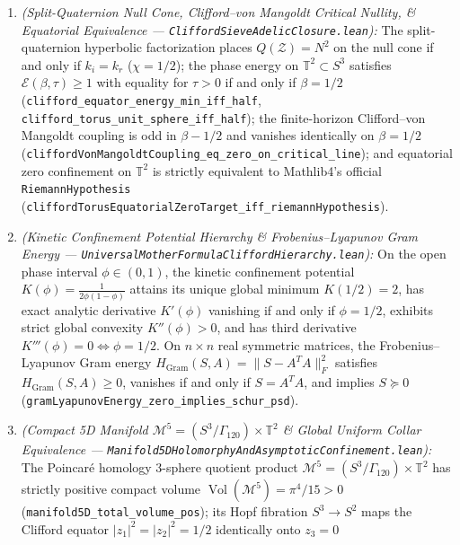 \documentclass[
  11pt,
]{article}
\providecommand{\tightlist}{%
  \setlength{\itemsep}{0pt}\setlength{\parskip}{0pt}}
\begin{document}
\begin{enumerate}
\def\labelenumi{\arabic{enumi}.}
\tightlist
\item
  \emph{(Split-Quaternion Null Cone, Clifford--von Mangoldt Critical
  Nullity, \& Equatorial Equivalence ---
  \texttt{CliffordSieveAdelicClosure.lean}):} The split-quaternion
  hyperbolic factorization places \(Q(\mathcal{Z}) = N^2\) on the null
  cone if and only if \(k_i = k_r\) (\(\chi = 1/2\)); the phase energy
  on \(\mathbb{T}^2 \subset S^3\) satisfies
  \(\mathcal{E}(\beta, \tau) \ge 1\) with equality for \(\tau > 0\) if
  and only if \(\beta = 1/2\)
  (\texttt{clifford\_equator\_energy\_min\_iff\_half},
  \texttt{clifford\_torus\_unit\_sphere\_iff\_half}); the finite-horizon
  Clifford--von Mangoldt coupling is odd in \(\beta - 1/2\) and vanishes
  identically on \(\beta = 1/2\)
  (\texttt{cliffordVonMangoldtCoupling\_eq\_zero\_on\_critical\_line});
  and equatorial zero confinement on \(\mathbb{T}^2\) is strictly
  equivalent to Mathlib4's official \texttt{RiemannHypothesis}
  (\texttt{cliffordTorusEquatorialZeroTarget\_iff\_riemannHypothesis}).
\item
  \emph{(Kinetic Confinement Potential Hierarchy \& Frobenius--Lyapunov
  Gram Energy ---
  \texttt{UniversalMotherFormulaCliffordHierarchy.lean}):} On the open
  phase interval \(\phi \in (0, 1)\), the kinetic confinement potential
  \(K(\phi) = \frac{1}{2\phi(1-\phi)}\) attains its unique global
  minimum \(K(1/2) = 2\), has exact analytic derivative \(K'(\phi)\)
  vanishing if and only if \(\phi = 1/2\), exhibits strict global
  convexity \(K''(\phi) > 0\), and has third derivative
  \(K'''(\phi) = 0 \iff \phi = 1/2\). On \(n \times n\) real symmetric
  matrices, the Frobenius--Lyapunov Gram energy
  \(H_{\text{Gram}}(S, A) = \|S - A^T A\|_F^2\) satisfies
  \(H_{\text{Gram}}(S, A) \ge 0\), vanishes if and only if
  \(S = A^T A\), and implies \(S \succeq 0\)
  (\texttt{gramLyapunovEnergy\_zero\_implies\_schur\_psd}).
\item
  \emph{(Compact 5D Manifold
  \(\mathcal{M}^5 = (S^3/\Gamma_{120}) \times \mathbb{T}^2\) \& Global
  Uniform Collar Equivalence ---
  \texttt{Manifold5DHolomorphyAndAsymptoticConfinement.lean}):} The
  Poincaré homology 3-sphere quotient product
  \(\mathcal{M}^5 = (S^3/\Gamma_{120}) \times \mathbb{T}^2\) has
  strictly positive compact volume
  \(\operatorname{Vol}(\mathcal{M}^5) = \pi^4/15 > 0\)
  (\texttt{manifold5D\_total\_volume\_pos}); its Hopf fibration
  \(S^3 \to S^2\) maps the Clifford equator \(|z_1|^2 = |z_2|^2 = 1/2\)
  identically onto \(z_3 = 0\)

\end{enumerate}
\end{document}
